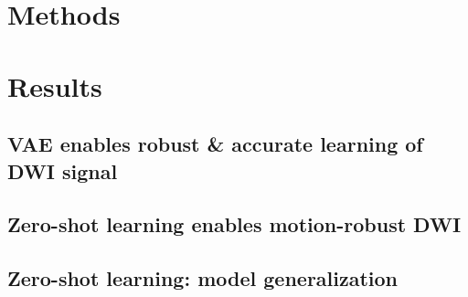 \documentclass[journal,twoside,web]{ieeecolor}
\begin{document}



	\section{Methods}



	\section{Results}

	\subsection{VAE enables robust \& accurate learning of DWI signal}

	\subsection{Zero-shot learning enables motion-robust DWI}

	\subsection{Zero-shot learning: model generalization}
\end{document}
